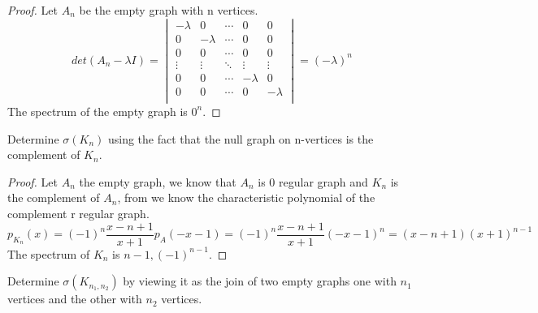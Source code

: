 \documentclass[a4paper, 11pt, oneside]{article}
\newenvironment{problem}[1]
  {\renewcommand\theinnercustomprob{#1}\innercustomprob}
  {\endinnercustomprob}
\begin{document}
\begin{proof}
Let $A_n$ be the empty graph with n vertices.
\begin{equation*}
det(A_n - \lambda I) =
\begin{vmatrix}
-\lambda & 0             &  \cdots                     & 0    & 0 \\ 
0             & -\lambda &  \cdots & 0               & 0\\
0             & 0             &  \cdots & 0               & 0 \\
\vdots      & \vdots     & \ddots  &\vdots         &\vdots \\
0             & 0             & \cdots  &   -\lambda  & 0 \\ 
0             & 0             & \cdots  & 0                & -\lambda   \\ 
\end{vmatrix} = (-\lambda)^n
\end{equation*}
The spectrum of the empty graph is $0^n$.
\end{proof}

\begin{problem}{2.2.2}\label{problem2.2.2}
Determine $\sigma(K_n)$ using the fact that the null graph on n-vertices is the complement of $K_n$.
\end{problem}

\begin{proof}
Let $A_n$ the empty graph, we know that $A_n$ is $0$ regular graph and $K_n$ is the complement of $A_n$, from \cite[Proposition 10]{adjacency_matrix} we know the characteristic polynomial of the complement r regular graph.
\begin{equation*}
p_{K_n}(x) = (-1)^n\frac{x - n + 1}{x + 1} p_A(-x -1) = (-1)^n\frac{x - n + 1}{x + 1} ( -x -1)^n = (x - n + 1)  (x + 1)^{n-1}
\end{equation*}
The spectrum of $K_n$ is $n-1, (-1)^{n-1}$.
\end{proof}

\begin{problem}{2.3}\label{problem2.3}
Determine $\sigma(K_{n_1,n_2})$ by viewing it as the join of two empty graphs one with $n_1$ vertices and the other with $n_2$ vertices.
\end{problem}
\end{document}
